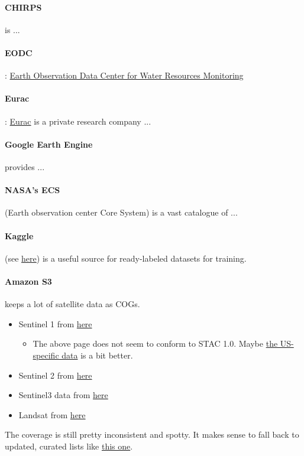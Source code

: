 \paragraph{CHIRPS} is ...

\paragraph{EODC}: \href{https://www.eodc.eu/}{Earth Observation Data Center for Water Resources Monitoring}

\paragraph{Eurac}: \href{http://www.eurac.edu}{Eurac} is a private research company ...

\paragraph{Google Earth Engine} provides ...

\paragraph{NASA's ECS} (Earth observation center Core System) is a vast catalogue of ...

\paragraph{Kaggle} (see \href{https://www.kaggle.com/search?q=sentinel}{here}) is a useful source for ready-labeled datasets for training.

\paragraph{Amazon S3} keeps a lot of satellite data as COGs. \begin{itemize}
    \item Sentinel 1 from \href{https://registry.opendata.aws/sentinel-1/}{here} \begin{itemize}
            \item The above page does not seem to conform to STAC 1.0. Maybe \href{https://raw.githubusercontent.com/scottyhq/sentinel1-rtc-stac/main/13SBD/catalog.json}{the US-specific data} is a bit better.
        \end{itemize}
    \item Sentinel 2 from \href{https://sentinel-cogs.s3.us-west-2.amazonaws.com/sentinel-s2-l2a-cogs/2020/S2A_36QWD_20200701_0_L2A/TCI.tif}{here}
\item Sentinel3 data from \href{https://github.com/Sentinel-5P/data-on-s3/blob/master/DocsForAws/Sentinel3Description.md}{here}                 
    \item Landsat from \href{https://landsat-pds.s3.amazonaws.com/c1/L8/139/045/LC08_L1TP_139045_20170304_20170316_01_T1/LC08_L1TP_139045_20170304_20170316_01_T1}{here}
\end{itemize}
The coverage is still pretty inconsistent and spotty. It makes sense to fall back to updated, curated lists like \href{https://github.com/Fernerkundung/awesome-sentinel}{this one}.


